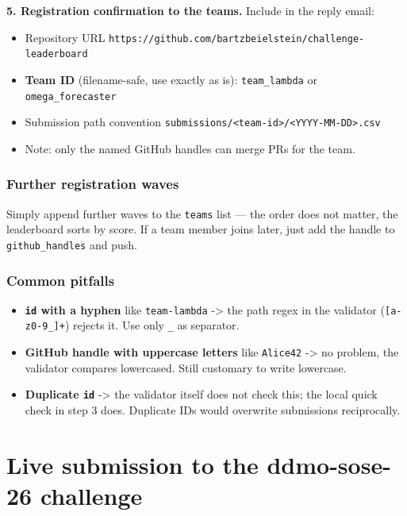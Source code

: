 \documentclass[
  english,
  letterpaper,
]{scrbook}
\providecommand{\tightlist}{%
  \setlength{\itemsep}{0pt}\setlength{\parskip}{0pt}}
\begin{document}
\textbf{5. Registration confirmation to the teams.} Include in the reply
email:

\begin{itemize}
\tightlist
\item
  Repository URL
  \texttt{https://github.com/bartzbeielstein/challenge-leaderboard}
\item
  \textbf{Team ID} (filename-safe, use exactly as is):
  \texttt{team\_lambda} or \texttt{omega\_forecaster}
\item
  Submission path convention
  \texttt{submissions/\textless{}team-id\textgreater{}/\textless{}YYYY-MM-DD\textgreater{}.csv}
\item
  Note: only the named GitHub handles can merge PRs for the team.
\end{itemize}

\subsection{Further registration
waves}\label{further-registration-waves}

Simply append further waves to the \texttt{teams} list --- the order
does not matter, the leaderboard sorts by score. If a team member joins
later, just add the handle to \texttt{github\_handles} and push.

\subsection{Common pitfalls}\label{common-pitfalls}

\begin{itemize}
\tightlist
\item
  \textbf{\texttt{id} with a hyphen} like \texttt{team-lambda}
  -\textgreater{} the path regex in the validator
  (\texttt{{[}a-z0-9\_{]}+}) rejects it. Use only \texttt{\_} as
  separator.
\item
  \textbf{GitHub handle with uppercase letters} like \texttt{Alice42}
  -\textgreater{} no problem, the validator compares lowercased. Still
  customary to write lowercase.
\item
  \textbf{Duplicate \texttt{id}} -\textgreater{} the validator itself
  does not check this; the local quick check in step 3 does. Duplicate
  IDs would overwrite submissions reciprocally.
\end{itemize}


\chapter{Live submission to the ddmo-sose-26
challenge}\label{sec-live-submission}
\end{document}
